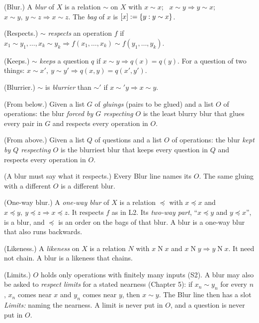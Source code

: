 \begin{lines}
\item[\lab{L1}] (Blur.) A \emph{blur} of $X$ is a relation $\sim$ on $X$ with $x \sim x$; \ $x \sim y \Rightarrow y \sim x$; \ $x \sim y,\ y \sim z \Rightarrow x \sim z$. The \emph{bag} of $x$ is $[x] := \{y : y \sim x\}$.
\item[\lab{L2}] (Respects.) $\sim$ \emph{respects} an operation $f$ if $x_1 \sim y_1, \dots, x_k \sim y_k \Rightarrow f(x_1, \dots, x_k) \sim f(y_1, \dots, y_k)$.
\item[\lab{L3}] (Keeps.) $\sim$ \emph{keeps} a question $q$ if $x \sim y \Rightarrow q(x) = q(y)$. For a question of two things: $x \sim x',\ y \sim y' \Rightarrow q(x,y) = q(x',y')$.
\item[\lab{L4}] (Blurrier.) $\sim$ is \emph{blurrier} than $\sim'$ if $x \sim' y \Rightarrow x \sim y$.
\item[\lab{L5}] (From below.) Given a list $G$ of \emph{gluings} (pairs to be glued) and a list $O$ of operations: the blur \emph{forced by $G$ respecting $O$} is the least blurry blur that glues every pair in $G$ and respects every operation in $O$.
\item[\lab{L6}] (From above.) Given a list $Q$ of questions and a list $O$ of operations: the blur \emph{kept by $Q$ respecting $O$} is the blurriest blur that keeps every question in $Q$ and respects every operation in $O$.
\item[\lab{L7}] (A blur must say what it respects.) Every Blur line names its $O$. The same gluing with a different $O$ is a different blur.
\item[\lab{L8}] (One-way blur.) A \emph{one-way blur} of $X$ is a relation $\preceq$ with $x \preceq x$ and $x \preceq y,\ y \preceq z \Rightarrow x \preceq z$. It respects $f$ as in L2. Its \emph{two-way part}, ``$x \preceq y$ and $y \preceq x$'', is a blur, and $\preceq$ is an order on the bags of that blur. A blur is a one-way blur that also runs backwards.
\item[\lab{L9}] (Likeness.) A \emph{likeness} on $X$ is a relation $N$ with $x \mathrel{N} x$ and $x \mathrel{N} y \Rightarrow y \mathrel{N} x$. It need not chain. A blur is a likeness that chains.
\item[\lab{L10}] (Limits.) $O$ holds only operations with finitely many inputs (S2). A blur may also be asked to \emph{respect limits} for a stated nearness (Chapter 5): if $x_n \sim y_n$ for every $n$, $x_n$ comes near $x$ and $y_n$ comes near $y$, then $x \sim y$. The Blur line then has a slot \emph{Limits:} naming the nearness. A limit is never put in $O$, and a question is never put in $O$.
\end{lines}

